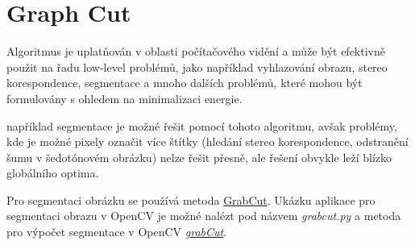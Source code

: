 \documentclass[12pt, a4paper]{article}
\begin{document}
\section{Graph Cut}
\par{Algoritmus je uplatňován v oblasti počítačového vidění a může být efektivně použit na řadu low-level problémů, jako například vyhlazování obrazu, stereo korespondence, segmentace a mnoho dalších problémů, které mohou být formulovány s ohledem na minimalizaci energie.}

\par{ například segmentace je možné řešit pomocí tohoto algoritmu, avšak problémy, kde je možné pixely označit více štítky (hledání stereo korespondence, odstranění šumu v šedotónovém obrázku) nelze řešit přesně, ale řešení obvykle leží blízko globálního optima.}

\par{Pro segmentaci obrázku se používá metoda \href{http://en.wikipedia.org/wiki/GrabCut}{GrabCut}. Ukázku aplikace pro segmentaci obrazu v OpenCV je možné nalézt pod názvem \textit{grabcut.py} a metoda pro výpočet segmentace v OpenCV \href{http://docs.opencv.org/modules/imgproc/doc/miscellaneous_transformations.html?highlight=grabcut#cv2.grabCut}{\textit{grabCut}}.}
\end{document}
